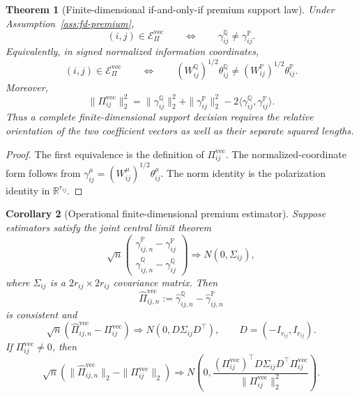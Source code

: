 \documentclass[11pt,a4paper]{amsart}
\theoremstyle{plain}
\newtheorem{theorem}{Theorem}[section]
\newtheorem{corollary}[theorem]{Corollary}
\theoremstyle{definition}
\theoremstyle{remark}
\newcommand{\R}{\mathbb{R}}
\newcommand{\PP}{\mathbb{P}}
\newcommand{\QQ}{\mathbb{Q}}
\newcommand{\cE}{\mathcal{E}}
\begin{document}
\begin{theorem}[Finite-dimensional if-and-only-if premium support law]\label{thm:fd-premium-iff}
Under Assumption~\ref{ass:fd-premium},
\[
        (i,j)\in\cE_\Pi^{\mathrm{vec}}
        \qquad\Longleftrightarrow\qquad
        \gamma_{ij}^\QQ\ne\gamma_{ij}^\PP.
\]
Equivalently, in signed normalized information coordinates,
\[
        (i,j)\in\cE_\Pi^{\mathrm{vec}}
        \qquad\Longleftrightarrow\qquad
        (W_{ij}^\QQ)^{1/2}\theta_{ij}^\QQ
        \ne
        (W_{ij}^\PP)^{1/2}\theta_{ij}^\PP.
\]
Moreover,
\[
        \|\Pi_{ij}^{\mathrm{vec}}\|_2^2
        =
        \|\gamma_{ij}^\QQ\|_2^2
        +
        \|\gamma_{ij}^\PP\|_2^2
        -
        2\langle \gamma_{ij}^\QQ,\gamma_{ij}^\PP\rangle.
\]
Thus a complete finite-dimensional support decision requires the relative orientation of the two
coefficient vectors as well as their separate squared lengths.
\end{theorem}

\begin{proof}
The first equivalence is the definition of \(\Pi_{ij}^{\mathrm{vec}}\).  The normalized-coordinate
form follows from \(\gamma_{ij}^\mu=(W_{ij}^\mu)^{1/2}\theta_{ij}^\mu\).  The norm identity is the
polarization identity in \(\R^{r_{ij}}\).
\end{proof}

\begin{corollary}[Operational finite-dimensional premium estimator]\label{cor:fd-premium-estimator}
Suppose estimators satisfy the joint central limit theorem
\[
        \sqrt n
        \begin{pmatrix}
                \widehat\gamma_{ij,n}^\PP-\gamma_{ij}^\PP\\
                \widehat\gamma_{ij,n}^\QQ-\gamma_{ij}^\QQ
        \end{pmatrix}
        \Rightarrow
        N(0,\Sigma_{ij}),
\]
where \(\Sigma_{ij}\) is a \(2r_{ij}\times2r_{ij}\) covariance matrix.  Then
\[
        \widehat\Pi_{ij,n}^{\mathrm{vec}}
        :=
        \widehat\gamma_{ij,n}^\QQ-
        \widehat\gamma_{ij,n}^\PP
\]
is consistent and
\[
        \sqrt n(\widehat\Pi_{ij,n}^{\mathrm{vec}}-\Pi_{ij}^{\mathrm{vec}})
        \Rightarrow
        N(0,D\Sigma_{ij}D^\top),
        \qquad
        D=(-I_{r_{ij}},I_{r_{ij}}).
\]
If \(\Pi_{ij}^{\mathrm{vec}}\ne0\), then
\[
        \sqrt n
        \left(
                \|\widehat\Pi_{ij,n}^{\mathrm{vec}}\|_2
                -
                \|\Pi_{ij}^{\mathrm{vec}}\|_2
        \right)
        \Rightarrow
        N\!\left(0,
                \frac{(\Pi_{ij}^{\mathrm{vec}})^\top D\Sigma_{ij}D^\top\Pi_{ij}^{\mathrm{vec}}}
                {\|\Pi_{ij}^{\mathrm{vec}}\|_2^2}
        \right).
\]
\end{corollary}
\end{document}
